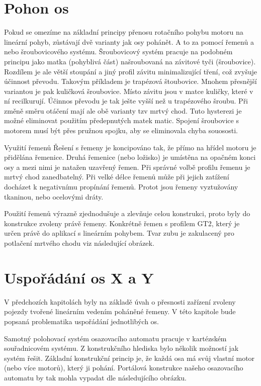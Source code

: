 \section{Pohon os}
Pokud se omezíme na základní principy přenosu rotačního pohybu motoru na lineární pohyb, zůstávají dvě varianty jak osy pohánět. A to za pomocí řemenů a nebo šroubovicového systému.
Šroubovicový systém pracuje na podobném principu jako matka (pohyblivá část) našroubovaná na závitové tyči (šroubovice). Rozdílem je ale větší stoupání a jiný profil závitu minimalizující tření, což zvyšuje účinnost převodu. Takovým příkladem je trapézová štoubovice. Mnohem přesnější variantou je pak kuličková šroubovice. Místo závitu jsou v matce kuličky, které v ní recilkurují. Účinnos převodu je tak ješte vyšší než u trapézového šroubu. Při změně směru otáčení mají ale obě varianty tzv mrtvý chod. Tuto hysterezi je možné eliminovat použitím předepnutých matek matic.
Spojení šroubovice s motorem musí být přes pružnou spojku, aby se eliminovala chyba souososti.

Využití řemenů 
Řešení s řemeny je koncipováno tak, že přímo na hřídel motoru je přidělána řemenice. Druhá řemenice (nebo ložisko) je umístěna na opačném konci osy a mezi nimi je natažen uzavřený řemen.
Při správné volbě profilu řemenu je mrtvý chod zanedbatelný. Při velké délce řemenů může při jejich zatížení docházet k negativnímu propínání řemenů. Protot jsou řemeny vyztužovány tkaninou, nebo ocelovými dráty.

Použití řemenů výrazně zjednodušuje a zlevňuje celou konstrukci, proto byly do konstrukce zvoleny právě řemeny. Konkrétně řemen s profilem GT2, který je určen právě do aplikací s lineárním pohybem. Tvar zubu je zakulacený pro potlačení mrtvého chodu viz následující obrázek.


\section{Uspořádání os X a Y}

V předchozích kapitolách byly na základě úvah o přesnosti zařízení zvoleny pojezdy tvořené lineárním vedením poháněné řemeny. V této kapitole bude popsaná problematika uspořádání jednotlibých os.

Samotný polohovací systém osazovacího automatu pracuje v kartézském souřadnicovém systému.  Z konstrukčního hlediska bylo několik možností jak systém řešit. Základní konstrukční princip je, že každá osa má svůj vlastní motor (nebo více motorů), který ji pohání. Portálová konstrukce našeho osazovacího automatu by tak mohla vypadat dle následujícího obrázku.

